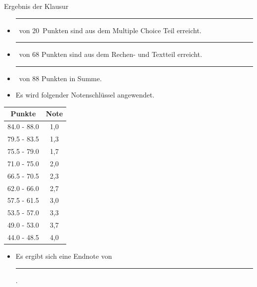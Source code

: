 \documentclass[a4paper, 10pt]{scrartcl}\usepackage[]{graphicx}\usepackage[]{xcolor}
\begin{document}
\begin{graybox}{Ergebnis der Klausur}
  \vspace{1Ex}
  \begin{itemize}
  \item[] \rule[0ex]{3em}{.4pt}\, von 20\, Punkten sind aus dem Multiple
    Choice Teil erreicht.
  \item[] \rule[0ex]{3em}{.4pt}\, von 68 Punkten sind aus dem Rechen- und
    Textteil erreicht. 
  \item[] \rule[0ex]{3em}{.4pt}\, von 88 Punkten in Summe.
  \item[] Es wird folgender Notenschl{\"u}ssel angewendet.   
  \end{itemize}
  \vspace{1ex}
\begin{center}
  \begin{tabular}[c]{cc}
    \toprule
    \textbf{Punkte}	&	\textbf{Note}	\\
    \midrule
    84.0 - 88.0	&	1,0	\\
    79.5 - 83.5	&	1,3	\\
    75.5 - 79.0	&	1,7	\\
    71.0 - 75.0	&	2,0	\\
    66.5 - 70.5	&	2,3	\\
    62.0 - 66.0	&	2,7	\\
    57.5 - 61.5	&	3,0	\\
    53.5 - 57.0	&	3,3	\\
    49.0 - 53.0	&	3,7	\\
    44.0 - 48.5	&	4,0	\\
    \bottomrule
  \end{tabular}
\end{center}
  \vspace{1ex}
\begin{itemize}
\item[] Es ergibt sich eine Endnote von \rule[0ex]{4em}{.4pt}.
\end{itemize}
  \vspace{1Ex}
\end{graybox}

\newpage
\end{document}
